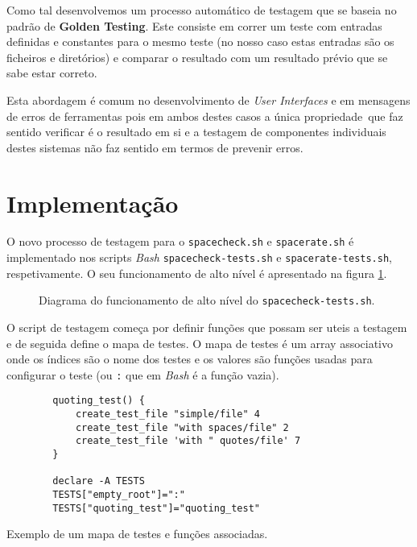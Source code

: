Como tal desenvolvemos um processo automático de testagem que se baseia no
padrão de \textbf{Golden Testing}\cite{goldenTestsAreTasty}.
Este consiste em correr um teste com entradas
definidas e constantes para o mesmo teste (no nosso caso estas entradas são os
ficheiros e diretórios) e comparar o resultado com um resultado prévio que se
sabe estar correto.

Esta abordagem é comum no desenvolvimento de \emph{User Interfaces}
\cite{ebayScreenshotTesting} e em mensagens de erros de ferramentas
\cite{brsonRustTested} pois em ambos destes casos a única propriedade\ que faz
sentido verificar é o resultado em si e a testagem de componentes individuais
destes sistemas não faz sentido em termos de prevenir erros.

\section{Implementação}

O novo processo de testagem para o \Verb|spacecheck.sh| e \Verb|spacerate.sh|
é implementado nos scripts \emph{Bash} \Verb|spacecheck-tests.sh| e
\Verb|spacerate-tests.sh|, respetivamente. O seu funcionamento de alto nível é
apresentado na figura \ref{fig:testing_diagram}.

\begin{figure}[H]
	\centering
	\begin{tikzpicture}[node distance=2cm]
		
	\end{tikzpicture}
	\cprotect\caption{Diagrama do funcionamento de alto nível do \Verb|spacecheck-tests.sh|.}
	\label{fig:testing_diagram}
\end{figure}

\newpage

O script de testagem começa por definir funções que possam ser uteis a testagem
e de seguida define o mapa de testes. O mapa de testes é um array associativo
onde os índices são o nome dos testes e os valores são funções usadas para
configurar o teste (ou \Verb|:| que em \emph{Bash} é a função vazia).


\begin{listing}[H]
	\centering
	\begin{verbatim}
		quoting_test() {
			create_test_file "simple/file" 4
			create_test_file "with spaces/file" 2
			create_test_file 'with " quotes/file' 7
		}

		declare -A TESTS
		TESTS["empty_root"]=":"
		TESTS["quoting_test"]="quoting_test"
	\end{verbatim}
	\cprotect\caption{Exemplo de um mapa de testes e funções associadas.}
\end{listing}

